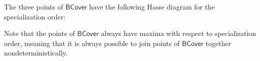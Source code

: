 \documentclass[conference]{IEEEtran}
\newcommand{\BCover}{\mathsf{BCover}}
\begin{document}
The three points of $\BCover$ have the following Hasse diagram for the specialization order:
\begin{center}
\end{center}
Note that the points of $\BCover$ always have maxima with respect to specialization order, meaning that it is always possible to join points of $\BCover$ together nondeterministically.
\end{document}

